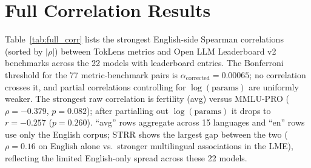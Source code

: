 \documentclass[11pt]{article}
\begin{document}
\section{Full Correlation Results}
\label{app:correlations}

Table~\ref{tab:full_corr} lists the strongest English-side Spearman correlations (sorted by $|\rho|$) between TokLens metrics and Open LLM Leaderboard v2 benchmarks across the 22 models with leaderboard entries. The Bonferroni threshold for the 77 metric-benchmark pairs is $\alpha_{\text{corrected}} = 0.00065$; no correlation crosses it, and partial correlations controlling for $\log(\text{params})$ are uniformly weaker. The strongest raw correlation is fertility (avg) versus MMLU-PRO ($\rho = -0.379$, $p = 0.082$); after partialling out $\log(\text{params})$ it drops to $r = -0.257$ ($p = 0.260$). ``avg'' rows aggregate across 15 languages and ``en'' rows use only the English corpus; STRR shows the largest gap between the two ($\rho = 0.16$ on English alone vs.\ stronger multilingual associations in the LME), reflecting the limited English-only spread across these 22 models.
\end{document}
